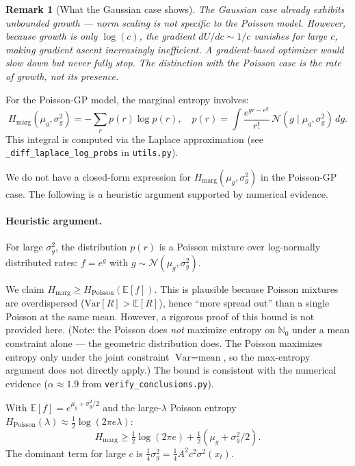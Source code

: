 \documentclass[11pt]{article}
\newtheorem{remark}{Remark}
\begin{document}
\begin{remark}[What the Gaussian case shows]\label{rem:gaussian_growth}
The Gaussian case already exhibits unbounded growth --- norm scaling is not
specific to the Poisson model. However, because growth is only $\log(c)$,
the gradient $dU/dc \sim 1/c$ vanishes for large $c$, making gradient ascent
increasingly inefficient. A gradient-based optimizer would slow down but
never fully stop. The distinction with the Poisson case is the \emph{rate}
of growth, not its presence.
\end{remark}

For the Poisson-GP model, the marginal entropy involves:
\begin{equation}
    H_{\text{marg}}(\mu_g, \sigma^2_g) = -\sum_r p(r) \log p(r), \quad
    p(r) = \int \frac{e^{gr - e^g}}{r!} \, \mathcal{N}(g \mid \mu_g, \sigma^2_g) \, dg.
\end{equation}
This integral is computed via the Laplace approximation (see \texttt{\_diff\_laplace\_log\_probs}
in \texttt{utils.py}).

We do not have a closed-form expression for $H_{\text{marg}}(\mu_g, \sigma^2_g)$
in the Poisson-GP case. The following is a heuristic argument supported by
numerical evidence.

\paragraph{Heuristic argument.}
For large $\sigma^2_g$, the distribution $p(r)$ is a Poisson mixture
over log-normally distributed rates: $f = e^g$ with $g \sim \mathcal{N}(\mu_g, \sigma^2_g)$.

We claim $H_{\text{marg}} \geq H_{\text{Poisson}}(\mathbb{E}[f])$.
This is plausible because Poisson mixtures are overdispersed
($\text{Var}[R] > \mathbb{E}[R]$), hence ``more spread out'' than a single
Poisson at the same mean. However, a rigorous proof of this bound is not
provided here.  (Note: the Poisson does \emph{not} maximize entropy on
$\mathbb{N}_0$ under a mean constraint alone --- the geometric distribution
does. The Poisson maximizes entropy only under the joint constraint
$\text{Var} = \text{mean}$, so the max-entropy argument does not directly
apply.)  The bound is consistent with the numerical evidence
($\alpha \approx 1.9$ from \texttt{verify\_conclusions.py}).

With $\mathbb{E}[f] = e^{\mu_g + \sigma^2_g/2}$ and the large-$\lambda$
Poisson entropy $H_{\text{Poisson}}(\lambda) \approx \frac{1}{2}\log(2\pi e \lambda)$:
\[
    H_{\text{marg}} \geq \tfrac{1}{2}\log(2\pi e) + \tfrac{1}{2}(\mu_g + \sigma^2_g/2).
\]
The dominant term for large $c$ is $\frac{1}{4}\sigma^2_g = \frac{1}{4}A^2 c^2 \sigma^2(x_t)$.
\end{document}
